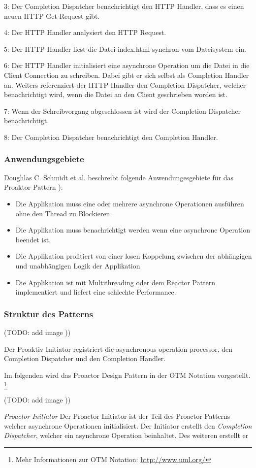 3: Der Completion Dispatcher benachrichtigt den HTTP Handler, dass es einen neuen HTTP Get Request gibt. 

4: Der HTTP Handler analysiert den HTTP Request.

5: Der HTTP Handler liest die Datei index.html synchron vom Dateisystem ein.

6: Der HTTP Handler initialisiert eine asynchrone Operation um die Datei in die Client Connection zu schreiben. Dabei gibt er sich selbst als Completion Handler an. Weiters referenziert der HTTP Handler den Completion Dispatcher, welcher benachrichtigt wird, wenn die Datei an den Client geschrieben worden ist. 

7: Wenn der Schreibvorgang abgeschlossen ist wird der Completion Dispatcher benachrichtigt. 

8: Der Completion Dispatcher benachrichtigt den Completion Handler. 


\subsubsection{Anwendungsgebiete}

Doughlas C. Schmidt et al. beschreibt folgende Anwendungesgebiete für das Proaktor Pattern \cite[p. 5]{Sch97}):

\begin{itemize}
  \item Die Applikation muss eine oder mehrere asynchrone Operationen ausführen ohne den Thread zu Blockieren.
  \item Die Applikation muss benachrichtigt werden wenn eine asynchrone Operation beendet ist. 
  \item Die Applikation profitiert von einer losen Koppelung zwischen der abhängigen und unabhängigen Logik der Applikation
  \item Die Applikation ist mit Multithreading oder dem Reactor Pattern implementiert und liefert eine schlechte Performance. 
\end{itemize}

\subsubsection{Struktur des Patterns}

(TODO: add image \cite[Figure 8]{Sch97}))

	Der Proaktiv Initiator registriert die asynchronous operation processor, den Completion Dispatcher und den Completion Handler. 

	



Im folgenden wird das Proactor Design Pattern in der OTM Notation vorgestellt. \footnote[0]{Mehr Informationen zur OTM Notation: \url{http://www.uml.org/}}

(TODO: add image \cite[Figure 7]{Sch97}))

\emph{Proactor Initiator}
	Der Proactor Initiator ist der Teil des Proactor Patterns welcher asynchrone Operationen initialisiert. Der Initiator erstellt den \emph{Completion Dispatcher}, welcher ein asynchrone Operation beinhaltet. Des weiteren erstellt er 
